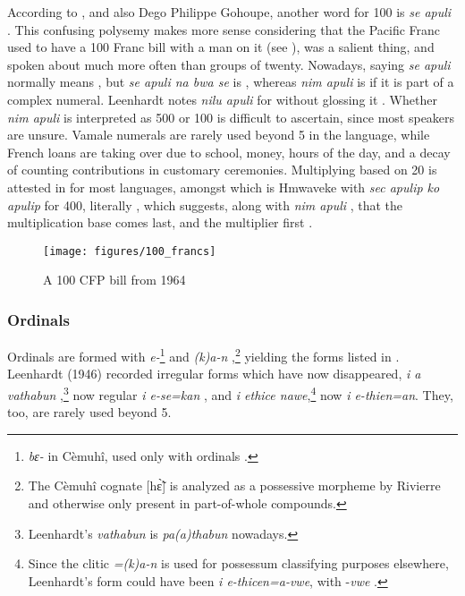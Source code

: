 According to \textcite[45]{rivierre_bwatoo_2006}, and also Dego Philippe Gohoupe, another word for 100 is \textit{se apuli} . This confusing polysemy makes more sense considering that the Pacific Franc used to have a 100 Franc bill with a man on it (see ), was a salient thing, and spoken about much more often than groups of twenty. Nowadays, saying \textit{se apuli} normally means , but \textit{se apuli na bwa se} is , whereas \textit{nim apuli} is  if it is part of a complex numeral. Leenhardt notes \textit{nilu apuli} for  without glossing it \parencite[166]{leenhardt_langues_1946}{}. Whether \textit{nim apuli} is interpreted as 500 or 100 is difficult to ascertain, since most speakers are unsure. Vamale numerals are rarely used beyond 5 in the language, while French loans are taking over due to school, money, hours of the day, and a decay of counting contributions in customary ceremonies. Multiplying based on 20 is attested in  for most languages, amongst which is Hmwaveke with \textit{sec apulip ko apulip} for 400, literally , which suggests, along with \textit{nim apuli} , that the multiplication base comes last, and the multiplier first \parencite{leenhardt_langues_1946}. 

\begin{figure}
\texttt{[image: figures/100\_francs]}
\caption{A 100 CFP bill from 1964 \parencite[24]{ieom_lhistoire_2014}}
	\label{fig:100CFP}
\end{figure}
 
\subsubsection{Ordinals}
\largerpage

Ordinals are formed with \textit{e-}\footnote{\textit{bɛ-} in Cèmuhî, used only with ordinals  \parencite[271]{rivierre_langue_1980}.} and \textit{(k)a-n} ,\footnote{The Cèmuhî cognate [hɛ̃̀] is analyzed as a possessive morpheme by Rivierre \parencite[271]{rivierre_langue_1980} and otherwise only present in part-of-whole compounds.} yielding the forms listed in . Leenhardt (1946) recorded irregular forms which have now disappeared, \textit{i a vathabun} ,\footnote{Leenhardt's \textit{vathabun} is \textit{pa(a)thabun} nowadays.} now regular \textit{i e-se=kan} , and \textit{i ethice nawe},\footnote{Since the clitic \textit{=(k)a-n} is used for possessum classifying purposes elsewhere, Leenhardt's form could have been \textit{i e-thicen=a-vwe}, with -\textit{vwe} .} now \textit{i e-thien=an}. They, too, are rarely used beyond 5.

